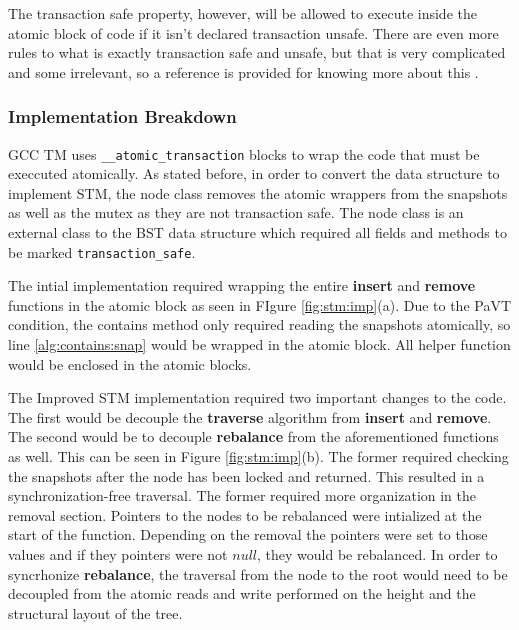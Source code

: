 \documentclass[conference]{IEEEtran}
\theoremstyle{definition}
\theoremstyle{theorem}
\begin{document}
The transaction safe property, however, will be allowed to execute inside the atomic block of code if it isn't declared transaction unsafe. There are even more rules to what is exactly transaction safe and unsafe, but that is very complicated and some irrelevant, so a reference is provided for knowing more about this \cite{b4}. 

\subsubsection{Implementation Breakdown}

GCC TM uses \texttt{\_\_atomic\_transaction} blocks to wrap the code that must be execcuted atomically. As stated before, in order to convert the data structure to implement STM, the node class removes the atomic wrappers from the snapshots as well as the mutex as they are not transaction safe. The node class is an external class to the BST data structure which required all fields and methods to be marked \texttt{transaction\_safe}. 

The intial implementation required wrapping the entire \textbf{insert} and \textbf{remove} functions in the atomic block as seen in FIgure \ref{fig:stm:imp}(a). Due to the PaVT condition, the contains method only required reading the snapshots atomically, so line \ref{alg:contains:snap} would be wrapped in the atomic block. All helper function would be enclosed in the atomic blocks.

The Improved STM implementation required two important changes to the code. The first would be decouple the \textbf{traverse} algorithm from \textbf{insert} and \textbf{remove}. The second would be to decouple \textbf{rebalance} from the aforementioned functions as well. This can be seen in Figure \ref{fig:stm:imp}(b). The former required checking the snapshots after the node has been locked and returned. This resulted in a synchronization-free traversal. The former required more organization in the removal section. Pointers to the nodes to be rebalanced were intialized at the start of the function. Depending on the removal the pointers were set to those values and if they pointers were not $null$, they would be rebalanced. In order to syncrhonize \textbf{rebalance}, the traversal from the node to the root would need to be decoupled from the atomic reads and write performed on the height and the structural layout of the tree. 
\end{document}
